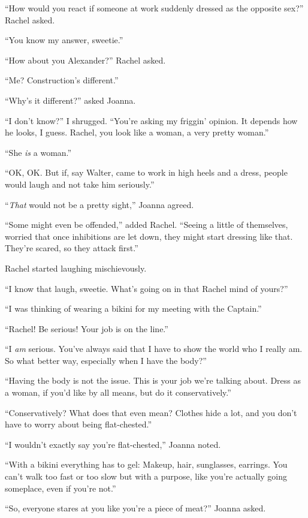 ``How would you react if someone at work suddenly dressed as the
opposite sex?'' Rachel asked.

``You know my answer, sweetie.''

``How about you Alexander?'' Rachel asked.

``Me? Construction's different.''

``Why's it different?'' asked Joanna.

``I don't know?'' I shrugged. ``You're asking my friggin' opinion. It
depends how he looks, I guess. Rachel, you look like a woman, a very
pretty woman.''

``She \emph{is} a woman.''

``OK, OK. But if, say Walter, came to work in high heels and a dress,
people would laugh and not take him seriously.''

``\emph{That} would not be a pretty sight,'' Joanna agreed.

``Some might even be offended,'' added Rachel. ``Seeing a little of
themselves, worried that once inhibitions are let down, they might start
dressing like that. They're scared, so they attack first.''

Rachel started laughing mischievously.

``I know that laugh, sweetie. What's going on in that Rachel mind of
yours?''

``I was thinking of wearing a bikini for my meeting with the Captain.''

``Rachel! Be serious! Your job is on the line.''

``I \emph{am} serious. You've always said that I have to show the world
who I really am. So what better way, especially when I have the body?''

``Having the body is not the issue. This is your job we're talking
about. Dress as a woman, if you'd like by all means, but do it
conservatively.''

``Conservatively? What does that even mean? Clothes hide a lot, and you
don't have to worry about being flat-chested.''

``I wouldn't exactly say you're flat-chested,'' Joanna noted.

``With a bikini everything has to gel: Makeup, hair, sunglasses,
earrings. You can't walk too fast or too slow but with a purpose, like
you're actually going someplace, even if you're not.''

``So, everyone stares at you like you're a piece of meat?'' Joanna
asked.

